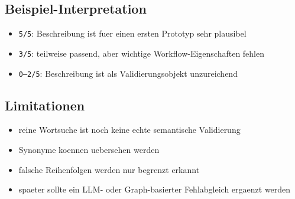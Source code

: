 \subsection{Beispiel-Interpretation}

\begin{itemize}
  \item \texttt{5/5}: Beschreibung ist fuer einen ersten Prototyp sehr plausibel
  \item \texttt{3/5}: teilweise passend, aber wichtige Workflow-Eigenschaften fehlen
  \item \texttt{0--2/5}: Beschreibung ist als Validierungsobjekt unzureichend
\end{itemize}

\subsection{Limitationen}

\begin{itemize}
  \item reine Wortsuche ist noch keine echte semantische Validierung
  \item Synonyme koennen uebersehen werden
  \item falsche Reihenfolgen werden nur begrenzt erkannt
  \item spaeter sollte ein LLM- oder Graph-basierter Fehlabgleich ergaenzt werden
\end{itemize}
